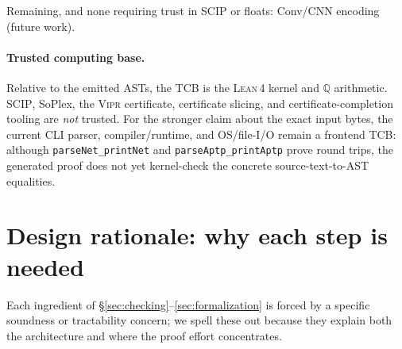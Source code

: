 \documentclass[runningheads]{llncs}
\newcommand{\Q}{\mathbb{Q}}
\newcommand{\vipr}{\textsc{Vipr}}
\newcommand{\scip}{\textsc{SCIP}}
\newcommand{\lean}{\textsc{Lean\,4}}
\newcommand{\code}[1]{\texttt{#1}}
\begin{document}
Remaining, and none requiring trust in \scip{} or floats: Conv/CNN encoding (future
work).

\paragraph{Trusted computing base.} Relative to the emitted ASTs, the TCB is the
\lean{} kernel and $\Q$ arithmetic. \scip, SoPlex, the \vipr{} certificate,
certificate slicing, and certificate-completion tooling are \emph{not} trusted.
For the stronger claim about the exact input bytes, the current CLI parser,
compiler/runtime, and OS/file-I/O remain a frontend TCB: although
\code{parseNet\_printNet} and \code{parseAptp\_printAptp} prove round trips,
the generated proof does not yet kernel-check the concrete source-text-to-AST
equalities.

\section{Design rationale: why each step is needed}\label{sec:rationale}

Each ingredient of \S\ref{sec:checking}--\ref{sec:formalization} is forced by a
specific soundness or tractability concern; we spell these out because they explain
both the architecture and where the proof effort concentrates.
\end{document}
